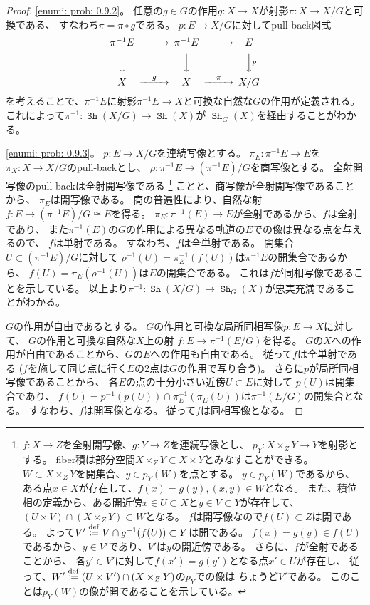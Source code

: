 \documentclass[uplatex]{jsarticle}
\theoremstyle{definition}
\newcommand{\dfn}{\overset{\mathrm{\tiny def}}{\coloneqq}}
\DeclareMathOperator{\Sh}{\mathtt{Sh}}
\begin{document}
\begin{proof}
  \ref{enumi: prob: 0.9.2}。
  任意の\(g\in G\)の作用\(g:X\to X\)が射影\(\pi:X\to X/G\)と可換である、
  すなわち\(\pi = \pi\circ g\)である。
  \(p:E\to X/G\)に対してpull-back図式
  \[
  \begin{CD}
    \pi^{-1}E @>>> \pi^{-1}E @>>> E \\
    @VVV @VVV @VVpV \\
    X @>g>> X @>\pi>> X/G
  \end{CD}
  \]
  を考えることで、\(\pi^{-1}E\)に射影\(\pi^{-1}E\to X\)と可換な自然な\(G\)の作用が定義される。
  これによって\(\pi^{-1}:\Sh(X/G) \to \Sh(X)\)が
  \(\Sh_G(X)\)を経由することがわかる。

  \ref{enumi: prob: 0.9.3}。
  \(p:E\to X/G\)を連続写像とする。
  \(\pi_E:\pi^{-1}E\to E\)を\(\pi_X:X\to X/G\)のpull-backとし、
  \(\rho:\pi^{-1}E\to (\pi^{-1}E)/G\)を商写像とする。
  全射開写像のpull-backは全射開写像である
  \footnote{\(f:X\to Z\)を全射開写像、\(g:Y\to Z\)を連続写像とし、
  \(p_Y:X\times_ZY\to Y\)を射影とする。
  fiber積は部分空間\(X\times_ZY\subset X\times Y\)とみなすことができる。
  \(W\subset X\times_ZY\)を開集合、\(y\in p_Y(W)\)を点とする。
  \(y\in p_Y(W)\)であるから、
  ある点\(x\in X\)が存在して、\(f(x) = g(y), (x,y)\in W\)となる。
  また、積位相の定義から、ある開近傍\(x\in U\subset X\)と\(y\in V\subset Y\)が存在して、
  \((U\times V) \cap (X\times_Z Y)\subset W\)となる。
  \(f\)は開写像なので\(f(U)\subset Z\)は開である。
  よって\(V'\dfn V\cap g^{-1}(f(U))\subset Y\)は開である。
  \(f(x) = g(y)\in f(U)\)であるから、\(y\in V'\)であり、\(V'\)は\(y\)の開近傍である。
  さらに、\(f\)が全射であることから、
  各\(y'\in V'\)に対して\(f(x')=g(y')\)となる点\(x'\in U\)が存在し、
  従って、\(W'\dfn (U\times V') \cap (X\times_Z Y)\)の\(p_Y\)での像は
  ちょうど\(V'\)である。
  このことは\(p_Y(W)\)の像が開であることを示している。}
  ことと、商写像が全射開写像であることから、
  \(\pi_E\)は開写像である。
  商の普遍性により、自然な射\(f:E\to (\pi^{-1}E)/G\cong E\)を得る。
  \(\pi_E:\pi^{-1}(E)\to E\)が全射であるから、\(f\)は全射であり、
  また\(\pi^{-1}(E)\)の\(G\)の作用による異なる軌道の\(E\)での像は異なる点を与えるので、
  \(f\)は単射である。
  すなわち、\(f\)は全単射である。
  開集合\(U\subset (\pi^{-1}E)/G\)に対して
  \(\rho^{-1}(U) = \pi_E^{-1}(f(U))\)は\(\pi^{-1}E\)の開集合であるから、
  \(f(U) = \pi_E(\rho^{-1}(U))\)は\(E\)の開集合である。
  これは\(f\)が同相写像であることを示している。
  以上より\(\pi^{-1}:\Sh(X/G) \to \Sh_G(X)\)が忠実充満であることがわかる。

  \(G\)の作用が自由であるとする。
  \(G\)の作用と可換な局所同相写像\(p:E\to X\)に対して、
  \(G\)の作用と可換な自然な\(X\)上の射
  \(f:E\to \pi^{-1}(E/G)\)を得る。
  \(G\)の\(X\)への作用が自由であることから、\(G\)の\(E\)への作用も自由である。
  従って\(f\)は全単射である
  (\(f\)を施して同じ点に行く\(E\)の2点は\(G\)の作用で写り合う)。
  さらに\(p\)が局所同相写像であることから、
  各\(E\)の点の十分小さい近傍\(U\subset E\)に対して
  \(p(U)\)は開集合であり、
  \(f(U) = p^{-1}(p(U))\cap \pi_E^{-1}(\pi_E(U))\)は\(\pi^{-1}(E/G)\)の開集合となる。
  すなわち、\(f\)は開写像となる。
  従って\(f\)は同相写像となる。


\end{proof}
\end{document}
